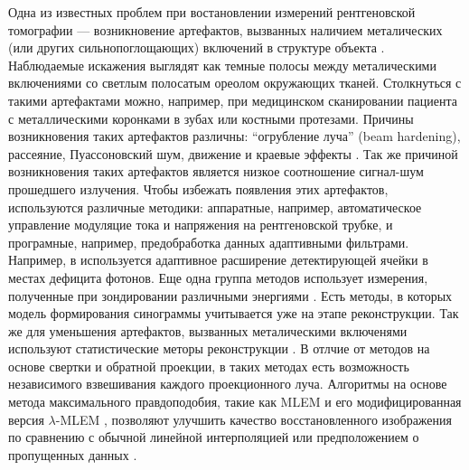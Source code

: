 Одна из известных проблем при востановлении измерений рентгеновской томографии --- возникновение артефактов, вызванных наличием металических (или других сильнопоглощающих) включений в структуре объекта \cite{barrett2004artifacts, boas2012ct, nasirudin2015reduction, park2015computed}.
Наблюдаемые искажения выглядят как темные полосы между металическими включениями со светлым полосатым ореолом окружающих тканей.
Столкнуться с такими артефактами можно, например, при медицинском сканировании пациента с металлическими коронками в зубах или костными протезами.
Причины возникновения таких артефактов различны: ``огрубление луча'' (beam hardening), рассеяние, Пуассоновский шум, движение и краевые эффекты \cite{boas2012ct}.
Так же причиной возникновения таких артефактов является низкое соотношение сигнал-шум прошедшего излучения.
Чтобы избежать появления этих артефактов, используются различные методики: аппаратные, например, автоматическое управление модуляцие тока и напряжения на рентгеновской трубке, и програмные, например, предобработка данных адаптивными фильтрами.
Например, в \cite{boas2012ct} используется адаптивное расширение детектирующей ячейки в местах дефицита фотонов.
Еще одна группа методов использует измерения, полученные при зондировании различными энергиями \cite{bamberg2011metal}.
Есть методы, в которых модель формирования синограммы учитывается уже на этапе реконструкции.
Так же для уменьшения артефактов, вызванных металическими включенями используют статистические меторы реконструкции \cite{jmuller2006, buzug2008computed}.
В отлчие от методов на основе свертки и обратной проекции, в таких методах есть возможность независимого взвешивания каждого проекционного луча.
Алгоритмы на основе метода максимального правдоподобия, такие как MLEM \cite{buzug2008computed} и его модифицированная версия $\lambda$-MLEM \cite{oehler2007statistical}, позволяют улучшить качество восстановленного изображения по сравнению с обычной линейной интерполяцией или предположением о пропущенных данных \cite{amirkhanov2012evaluation}.

\begin{comment}

\todo{введение - обзор из статьи аит2013 и бакалаврского диплома}

 Предлагаются новые версии алгоритмов, основанных на алгебраическом подходе, способных работать с сильно зашумлёнными проекциями. Такое условие сформировано необходимостью сокращать время регистрации проекций. Для некоторых применений уменьшение времени регистрации связано с требованием сокращения дозы облучения, для других --- обусловлено высокой динамикой поведения исследуемого объекта. Также следует отметить, что алгебраические методы реконструкции незаменимы, когда речь идет об экспериментах с малым числом проекционных углов и измерениях в ограниченном телесном угле. Только алгебраические методы применимы для решения задач трансмиссионно-эмиссионной томографии, если ослаблением зондирующего и вторичного излучений пренебречь нельзя.




\end{comment}

